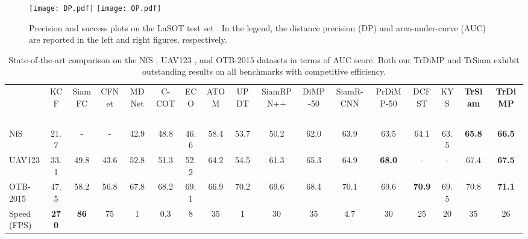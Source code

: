 \documentclass[10pt,twocolumn,letterpaper]{article}
\begin{document}
\begin{figure}[t]
	\centering
	\texttt{[image: DP.pdf]}
	\texttt{[image: OP.pdf]}
	\caption{Precision and success plots on the LaSOT  test set \cite{LaSOT}. In the legend, the distance precision (DP) and area-under-curve (AUC) are reported in the left and right figures, respectively.}
	\label{fig:lasot} 
	\vspace{-0.18in}
\end{figure}


\setlength{\tabcolsep}{2pt}
\begin{table*}[t]
	\scriptsize
	\begin{center}
		\caption{State-of-the-art comparison on the NfS \cite{NFSdataset}, UAV123 \cite{UAV123}, and OTB-2015 \cite{OTB-2015} datasets in terms of AUC score. Both our TrDiMP and TrSiam exhibit outstanding results on all benchmarks with competitive efficiency.} \label{table:uav_nfs}	
		\vspace{+0.06in}
		\begin{tabular*}{17.4 cm} {@{\extracolsep{\fill}}lcccccccccccccccc}
			\hline
			~ & KCF &SiamFC &CFNet &MDNet &C-COT &ECO &ATOM &UPDT &SiamRPN++ &DiMP-50 &SiamR-CNN &PrDiMP-50 &DCFST &KYS &{\bf TrSiam} &{\bf TrDiMP}\\
			
			~ &\cite{KCF} &\cite{SiamFC} &\cite{CFNet} &\cite{MDNet} &\cite{C-COT} &\cite{ECO} &\cite{ATOM} &\cite{UPDT} &\cite{siamrpn++}  &\cite{DiMP} &\cite{SiamRCNN} &\cite{PrDiMP} &\cite{DCFST} &\cite{KYS} & &\\
			\hline
			
			NfS \cite{NFSdataset}  &21.7 &- &- &42.9 &48.8 &46.6 &58.4 &53.7 &50.2 &62.0 &63.9 &63.5 &{ 64.1} &63.5 &{\bf \color{blue} 65.8} &{\bf \color{red} 66.5}\\
			
			UAV123 \cite{UAV123}  &33.1 &49.8 &43.6 &52.8 &51.3 &52.2 &64.2 &54.5 &61.3 &65.3 &64.9 &{\bf \color{red} 68.0} &- &- &{ 67.4} &{\bf \color{blue} 67.5}\\
			
			OTB-2015 \cite{OTB-2015} &47.5 &58.2 &56.8 &67.8 &68.2 &69.1 &66.9 &70.2 &69.6 &68.4 &70.1 &69.6 &{\bf \color{blue} 70.9} &69.5 &{ 70.8} &{\bf \color{red} 71.1}\\
			\hline
			Speed (FPS) &{\bf \color{red} 270} &{\color{blue} \bf 86} &75 &1 &0.3 &8 &35 &1 &30 &35 &4.7 &30 &25 &20 &35 &26\\
			\hline
		\end{tabular*}
	\end{center}
	\vspace{-0.2in}
\end{table*} 
\end{document}
